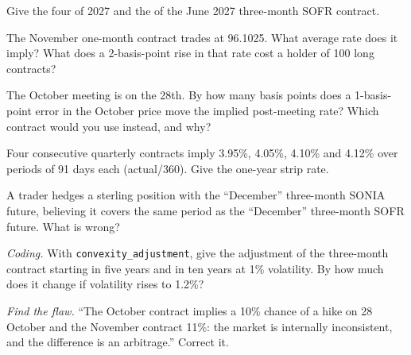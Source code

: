 \begin{exercise}[$\star$]\label{exo:m2:short-term-interest-rate-futures:2}
Give the four  of 2027 and the  of the June 2027
three-month SOFR contract.
\end{exercise}

\begin{exercise}[$\star$]\label{exo:m2:short-term-interest-rate-futures:3}
The November one-month contract trades at 96.1025. What average rate does it
imply? What does a 2-basis-point rise in that rate cost a holder of 100 long
contracts?
\end{exercise}

\begin{exercise}[$\star\star$]\label{exo:m2:short-term-interest-rate-futures:4}
The October meeting is on the 28th. By how many basis points does a
1-basis-point error in the October price move the implied post-meeting rate?
Which contract would you use instead, and why?
\end{exercise}

\begin{exercise}[$\star\star$]\label{exo:m2:short-term-interest-rate-futures:5}
Four consecutive quarterly contracts imply 3.95\%, 4.05\%, 4.10\% and 4.12\% over
periods of 91 days each (actual/360). Give the one-year strip rate.
\end{exercise}

\begin{exercise}[$\star\star$]\label{exo:m2:short-term-interest-rate-futures:6}
A trader hedges a sterling position with the ``December'' three-month SONIA
future, believing it covers the same period as the ``December'' three-month
SOFR future. What is wrong?
\end{exercise}

\begin{exercise}[$\star\star\star$]\label{exo:m2:short-term-interest-rate-futures:7}
\emph{Coding.} With \texttt{convexity\_adjustment}, give the adjustment of the
three-month contract starting in five years and in ten years at 1\% volatility.
By how much does it change if volatility rises to 1.2\%?
\end{exercise}

\begin{exercise}[$\star\star\star$]\label{exo:m2:short-term-interest-rate-futures:8}
\emph{Find the flaw.} ``The October contract implies a 10\% chance of a hike on
28 October and the November contract 11\%: the market is internally
inconsistent, and the difference is an arbitrage.'' Correct it.
\end{exercise}

